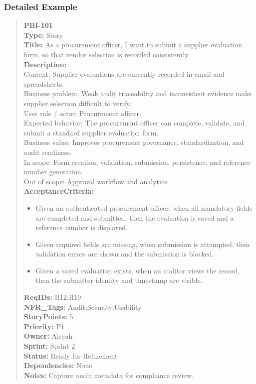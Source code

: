 \documentclass[11pt,a4paper]{article}
\begin{document}
\subsubsection*{Detailed Example}
\begin{quote}
\textbf{PBI-101} \\
\textbf{Type:} Story \\
\textbf{Title:} As a procurement officer, I want to submit a supplier evaluation form, so that vendor selection is recorded consistently \\

\textbf{Description:} \\
Context: Supplier evaluations are currently recorded in email and spreadsheets. \\
Business problem: Weak audit traceability and inconsistent evidence make supplier selection difficult to verify. \\
User role / actor: Procurement officer. \\
Expected behavior: The procurement officer can complete, validate, and submit a standard supplier evaluation form. \\
Business value: Improves procurement governance, standardization, and audit readiness. \\
In scope: Form creation, validation, submission, persistence, and reference number generation. \\
Out of scope: Approval workflow and analytics. \\

\textbf{AcceptanceCriteria:}
\begin{itemize}[leftmargin=1.5em]
    \item Given an authenticated procurement officer, when all mandatory fields are completed and submitted, then the evaluation is saved and a reference number is displayed.
    \item Given required fields are missing, when submission is attempted, then validation errors are shown and the submission is blocked.
    \item Given a saved evaluation exists, when an auditor views the record, then the submitter identity and timestamp are visible.
\end{itemize}

\textbf{ReqIDs:} R12;R19 \\
\textbf{NFR\_Tags:} Audit;Security;Usability \\
\textbf{StoryPoints:} 5 \\
\textbf{Priority:} P1 \\
\textbf{Owner:} Aisyah \\
\textbf{Sprint:} Sprint 2 \\
\textbf{Status:} Ready for Refinement \\
\textbf{Dependencies:} None \\
\textbf{Notes:} Capture audit metadata for compliance review.
\end{quote}
\end{document}
